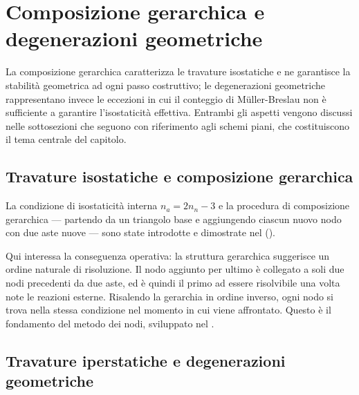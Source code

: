 \section{Composizione gerarchica e degenerazioni geometriche}
\label{sec:composizione_degenerazioni}

La composizione gerarchica caratterizza le travature
isostatiche e ne garantisce la stabilità geometrica
ad ogni passo costruttivo; le degenerazioni
geometriche rappresentano invece le eccezioni in
cui il conteggio di M\"{u}ller-Breslau non è sufficiente
a garantire l'isostaticità effettiva. Entrambi gli
aspetti vengono discussi nelle sottosezioni che
seguono con riferimento agli schemi piani, che
costituiscono il tema centrale del capitolo.

\subsection{Travature isostatiche e composizione
	gerarchica}
\label{subsec:reticolari_isostatiche}

La condizione di isostaticità interna $n_a = 2n_n - 3$
e la procedura di composizione gerarchica --- partendo
da un triangolo base e aggiungendo ciascun nuovo nodo
con due aste nuove --- sono state introdotte e
dimostrate nel 
().

Qui interessa la conseguenza operativa: la struttura
gerarchica suggerisce un ordine naturale di risoluzione.
Il nodo aggiunto per ultimo è collegato a soli due
nodi precedenti da due aste, ed è quindi il primo
ad essere risolvibile una volta note le reazioni
esterne. Risalendo la gerarchia in ordine inverso,
ogni nodo si trova nella stessa condizione nel
momento in cui viene affrontato. Questo è il
fondamento del metodo dei nodi, sviluppato nel
.


\subsection{Travature iperstatiche e degenerazioni
	geometriche}
\label{subsec:reticolari_iperstatiche}

